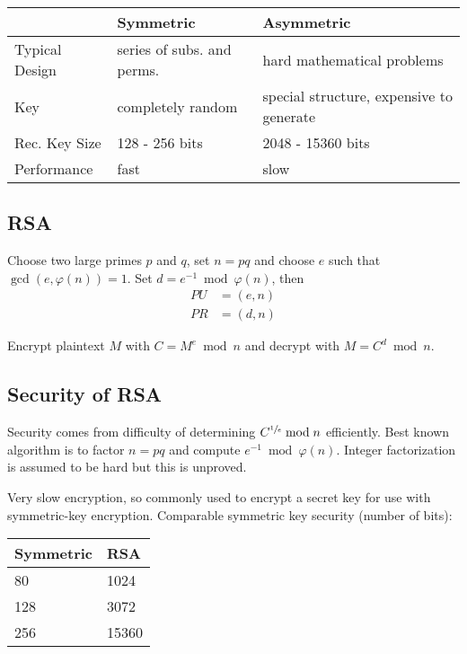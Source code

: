 \documentclass[draft]{article}
\begin{document}
\begin{tabular}{lll}
                   & Symmetric                  & Asymmetric                               \\\toprule
    Typical Design & series of subs. and perms. & hard mathematical problems               \\
    Key            & completely random          & special structure, expensive to generate \\
    Rec. Key Size  & 128 - 256 bits             & 2048 - 15360 bits                        \\
    Performance    & fast                       & slow                                     \\\bottomrule
\end{tabular}
\begin{multicols}{2}
    \subsection{RSA}
    Choose two large primes $p$ and $q$, set $n=pq$ and choose $e$ such that $\gcd(e, \varphi(n)) = 1$. Set $d=e^{-1}\bmod\varphi(n)$, then
    \begin{align*}PU&=(e, n)\\PR&=(d, n)\end{align*}

    Encrypt plaintext $M$ with $C=M^e \bmod{n}$ and decrypt with $M = C^d\bmod{n}$.

    \subsection{Security of RSA}
    Security comes from difficulty of determining $C^{\sfrac{1}{e}}\bmod{n}$ efficiently. Best known algorithm is to factor $n=pq$ and compute $e^{-1}\bmod{\varphi(n)}$. Integer factorization is assumed to be hard but this is unproved.

    Very slow encryption, so commonly used to encrypt a secret key for use with symmetric-key encryption. Comparable symmetric key security (number of bits):

    \begin{tabular}{ll}
        Symmetric & RSA   \\\toprule
        80        & 1024  \\
        128       & 3072  \\
        256       & 15360 \\\bottomrule
    \end{tabular}


\end{multicols}
\end{document}

